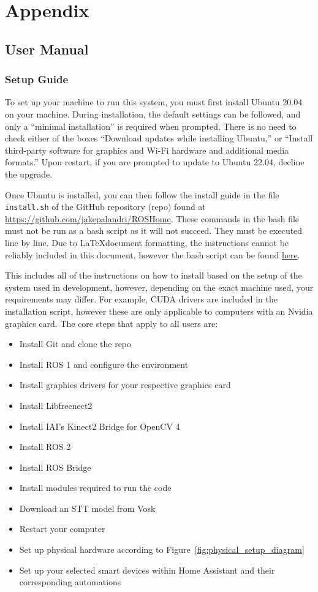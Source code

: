 \chapter{Appendix}\label{ch:appendix}

\section{User Manual}
\subsection{Setup Guide}
To set up your machine to run this system, you must first install Ubuntu 20.04 on your machine.
During installation, the default settings can be followed, and only a ``minimal installation'' is required when prompted.
There is no need to check either of the boxes ``Download updates while installing Ubuntu,'' or ``Install third-party software for graphics and Wi-Fi hardware and additional media formats.''
Upon restart, if you are prompted to update to Ubuntu 22.04, decline the upgrade.

Once Ubuntu is installed, you can then follow the install guide in the file \texttt{install.sh} of the GitHub repository (repo) found at \url{https://github.com/jakepalandri/ROSHome}.
These commands in the bash file must not be run as a bash script as it will not succeed.
They must be executed line by line.
Due to \LaTeX document formatting, the instructions cannot be reliably included in this document, however the bash script can be found \href{https://github.com/jakepalandri/ROSHome/blob/master/install.sh}{here}.

This includes all of the instructions on how to install based on the setup of the system used in development, however, depending on the exact machine used, your requirements may differ.
For example, CUDA drivers are included in the installation script, however these are only applicable to computers with an Nvidia graphics card.
The core steps that apply to all users are:

\begin{itemize}
    \item Install Git and clone the repo
    \item Install ROS 1 and configure the environment
    \item Install graphics drivers for your respective graphics card
    \item Install Libfreenect2
    \item Install IAI's Kinect2 Bridge for OpenCV 4
    \item Install ROS 2
    \item Install ROS Bridge
    \item Install modules required to run the code
    \item Download an STT model from Vosk
    \item Restart your computer
    \item Set up physical hardware according to Figure~\ref{fig:physical_setup_diagram}
    \item Set up your selected smart devices within Home Assistant and their corresponding automations 
\end{itemize}

